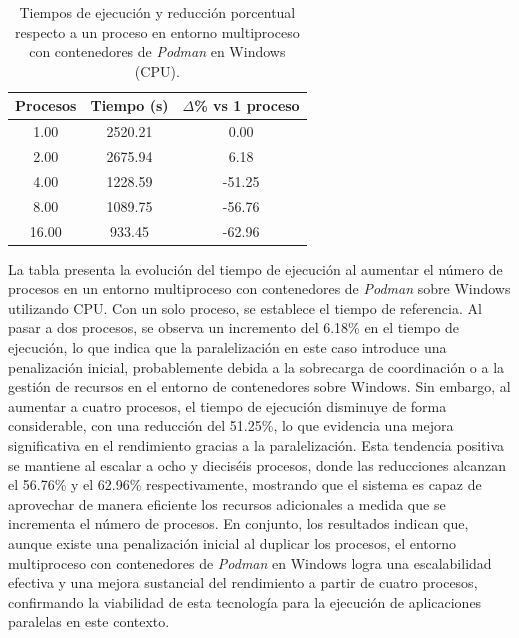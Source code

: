 \begin{table}[ht]
    \centering
    \begin{tabular}{|c|c|c|}
        \hline
        \textbf{Procesos} & \textbf{Tiempo (s)} & \textbf{$\Delta$\% vs 1 proceso} \\
        \hline
        1.00              & 2520.21             & 0.00                             \\
        2.00              & 2675.94             & 6.18                             \\
        4.00              & 1228.59             & -51.25                           \\
        8.00              & 1089.75             & -56.76                           \\
        16.00             & 933.45              & -62.96                           \\
        \hline
    \end{tabular}
    \caption{Tiempos de ejecución y reducción porcentual respecto a un proceso en entorno multiproceso con contenedores de \textit{Podman} en Windows (CPU).}
    \label{tab:multi-node_windows_podman}
\end{table}

La tabla presenta la evolución del tiempo de ejecución al aumentar el número de procesos en un entorno multiproceso con contenedores de \textit{Podman} sobre Windows utilizando CPU. Con un solo proceso, se establece el tiempo de referencia. Al pasar a dos procesos, se observa un incremento del 6.18\% en el tiempo de ejecución, lo que indica que la paralelización en este caso introduce una penalización inicial, probablemente debida a la sobrecarga de coordinación o a la gestión de recursos en el entorno de contenedores sobre Windows. Sin embargo, al aumentar a cuatro procesos, el tiempo de ejecución disminuye de forma considerable, con una reducción del 51.25\%, lo que evidencia una mejora significativa en el rendimiento gracias a la paralelización. Esta tendencia positiva se mantiene al escalar a ocho y dieciséis procesos, donde las reducciones alcanzan el 56.76\% y el 62.96\% respectivamente, mostrando que el sistema es capaz de aprovechar de manera eficiente los recursos adicionales a medida que se incrementa el número de procesos. En conjunto, los resultados indican que, aunque existe una penalización inicial al duplicar los procesos, el entorno multiproceso con contenedores de \textit{Podman} en Windows logra una escalabilidad efectiva y una mejora sustancial del rendimiento a partir de cuatro procesos, confirmando la viabilidad de esta tecnología para la ejecución de aplicaciones paralelas en este contexto.


